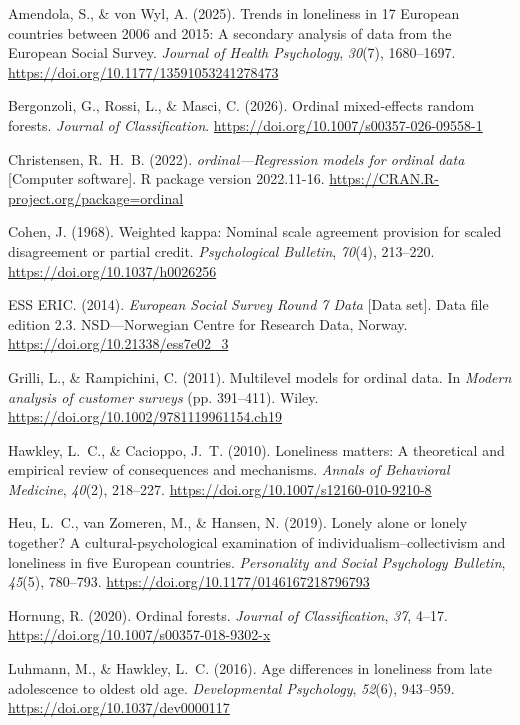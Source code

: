 \documentclass[12pt]{article}
\begin{document}
\begingroup
\setlength{\leftskip}{0.5in}
\setlength{\parindent}{-0.5in}
\setlength{\parskip}{0pt}

Amendola, S., \& von Wyl, A. (2025). Trends in loneliness in 17 European countries
between 2006 and 2015: A secondary analysis of data from the European Social Survey.
\emph{Journal of Health Psychology}, \emph{30}(7), 1680--1697.
\url{https://doi.org/10.1177/13591053241278473}

Bergonzoli, G., Rossi, L., \& Masci, C. (2026). Ordinal mixed-effects random forests.
\emph{Journal of Classification}. \url{https://doi.org/10.1007/s00357-026-09558-1}

Christensen, R.~H.~B. (2022). \emph{ordinal---Regression models for ordinal data}
[Computer software]. R package version 2022.11-16.
\url{https://CRAN.R-project.org/package=ordinal}

Cohen, J. (1968). Weighted kappa: Nominal scale agreement provision for scaled disagreement
or partial credit. \emph{Psychological Bulletin}, \emph{70}(4), 213--220.
\url{https://doi.org/10.1037/h0026256}

ESS ERIC. (2014). \emph{European Social Survey Round 7 Data} [Data set]. Data file edition
2.3. NSD---Norwegian Centre for Research Data, Norway.
\url{https://doi.org/10.21338/ess7e02_3}

Grilli, L., \& Rampichini, C. (2011). Multilevel models for ordinal data. In \emph{Modern
analysis of customer surveys} (pp. 391--411). Wiley.
\url{https://doi.org/10.1002/9781119961154.ch19}

Hawkley, L.~C., \& Cacioppo, J.~T. (2010). Loneliness matters: A theoretical and
empirical review of consequences and mechanisms. \emph{Annals of Behavioral Medicine},
\emph{40}(2), 218--227. \url{https://doi.org/10.1007/s12160-010-9210-8}

Heu, L.~C., van Zomeren, M., \& Hansen, N. (2019). Lonely alone or lonely together? A
cultural-psychological examination of individualism--collectivism and loneliness in five
European countries. \emph{Personality and Social Psychology Bulletin}, \emph{45}(5),
780--793. \url{https://doi.org/10.1177/0146167218796793}

Hornung, R. (2020). Ordinal forests. \emph{Journal of Classification}, \emph{37}, 4--17.
\url{https://doi.org/10.1007/s00357-018-9302-x}

Luhmann, M., \& Hawkley, L.~C. (2016). Age differences in loneliness from late
adolescence to oldest old age. \emph{Developmental Psychology}, \emph{52}(6), 943--959.
\url{https://doi.org/10.1037/dev0000117}
\end{document}
